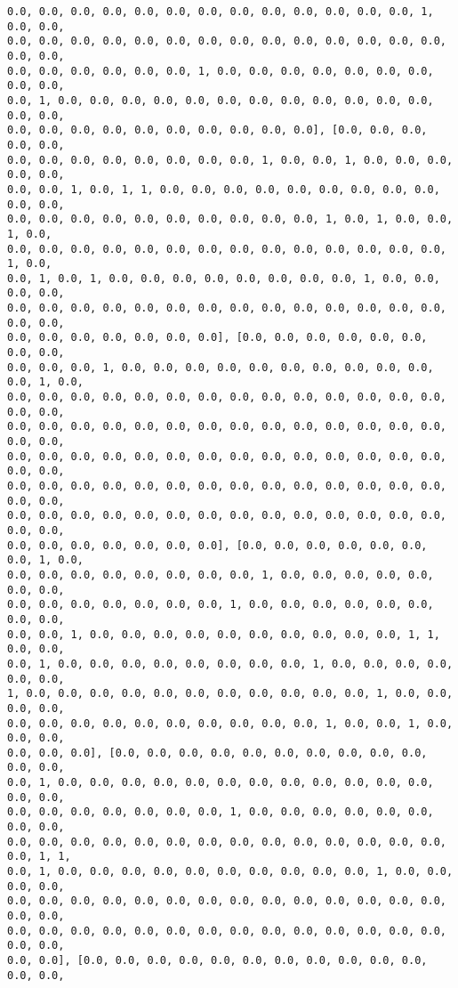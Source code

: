 \documentclass[11pt]{article}
\begin{document}
\begin{Verbatim}[commandchars=\\\{\}]
0.0, 0.0, 0.0, 0.0, 0.0, 0.0, 0.0, 0.0, 0.0, 0.0, 0.0, 0.0, 0.0, 1, 0.0, 0.0,
0.0, 0.0, 0.0, 0.0, 0.0, 0.0, 0.0, 0.0, 0.0, 0.0, 0.0, 0.0, 0.0, 0.0, 0.0, 0.0,
0.0, 0.0, 0.0, 0.0, 0.0, 0.0, 1, 0.0, 0.0, 0.0, 0.0, 0.0, 0.0, 0.0, 0.0, 0.0,
0.0, 1, 0.0, 0.0, 0.0, 0.0, 0.0, 0.0, 0.0, 0.0, 0.0, 0.0, 0.0, 0.0, 0.0, 0.0,
0.0, 0.0, 0.0, 0.0, 0.0, 0.0, 0.0, 0.0, 0.0, 0.0], [0.0, 0.0, 0.0, 0.0, 0.0,
0.0, 0.0, 0.0, 0.0, 0.0, 0.0, 0.0, 0.0, 1, 0.0, 0.0, 1, 0.0, 0.0, 0.0, 0.0, 0.0,
0.0, 0.0, 1, 0.0, 1, 1, 0.0, 0.0, 0.0, 0.0, 0.0, 0.0, 0.0, 0.0, 0.0, 0.0, 0.0,
0.0, 0.0, 0.0, 0.0, 0.0, 0.0, 0.0, 0.0, 0.0, 0.0, 1, 0.0, 1, 0.0, 0.0, 1, 0.0,
0.0, 0.0, 0.0, 0.0, 0.0, 0.0, 0.0, 0.0, 0.0, 0.0, 0.0, 0.0, 0.0, 0.0, 1, 0.0,
0.0, 1, 0.0, 1, 0.0, 0.0, 0.0, 0.0, 0.0, 0.0, 0.0, 0.0, 1, 0.0, 0.0, 0.0, 0.0,
0.0, 0.0, 0.0, 0.0, 0.0, 0.0, 0.0, 0.0, 0.0, 0.0, 0.0, 0.0, 0.0, 0.0, 0.0, 0.0,
0.0, 0.0, 0.0, 0.0, 0.0, 0.0, 0.0], [0.0, 0.0, 0.0, 0.0, 0.0, 0.0, 0.0, 0.0,
0.0, 0.0, 0.0, 1, 0.0, 0.0, 0.0, 0.0, 0.0, 0.0, 0.0, 0.0, 0.0, 0.0, 0.0, 1, 0.0,
0.0, 0.0, 0.0, 0.0, 0.0, 0.0, 0.0, 0.0, 0.0, 0.0, 0.0, 0.0, 0.0, 0.0, 0.0, 0.0,
0.0, 0.0, 0.0, 0.0, 0.0, 0.0, 0.0, 0.0, 0.0, 0.0, 0.0, 0.0, 0.0, 0.0, 0.0, 0.0,
0.0, 0.0, 0.0, 0.0, 0.0, 0.0, 0.0, 0.0, 0.0, 0.0, 0.0, 0.0, 0.0, 0.0, 0.0, 0.0,
0.0, 0.0, 0.0, 0.0, 0.0, 0.0, 0.0, 0.0, 0.0, 0.0, 0.0, 0.0, 0.0, 0.0, 0.0, 0.0,
0.0, 0.0, 0.0, 0.0, 0.0, 0.0, 0.0, 0.0, 0.0, 0.0, 0.0, 0.0, 0.0, 0.0, 0.0, 0.0,
0.0, 0.0, 0.0, 0.0, 0.0, 0.0, 0.0], [0.0, 0.0, 0.0, 0.0, 0.0, 0.0, 0.0, 1, 0.0,
0.0, 0.0, 0.0, 0.0, 0.0, 0.0, 0.0, 0.0, 1, 0.0, 0.0, 0.0, 0.0, 0.0, 0.0, 0.0,
0.0, 0.0, 0.0, 0.0, 0.0, 0.0, 0.0, 1, 0.0, 0.0, 0.0, 0.0, 0.0, 0.0, 0.0, 0.0,
0.0, 0.0, 1, 0.0, 0.0, 0.0, 0.0, 0.0, 0.0, 0.0, 0.0, 0.0, 0.0, 1, 1, 0.0, 0.0,
0.0, 1, 0.0, 0.0, 0.0, 0.0, 0.0, 0.0, 0.0, 0.0, 1, 0.0, 0.0, 0.0, 0.0, 0.0, 0.0,
1, 0.0, 0.0, 0.0, 0.0, 0.0, 0.0, 0.0, 0.0, 0.0, 0.0, 0.0, 1, 0.0, 0.0, 0.0, 0.0,
0.0, 0.0, 0.0, 0.0, 0.0, 0.0, 0.0, 0.0, 0.0, 0.0, 1, 0.0, 0.0, 1, 0.0, 0.0, 0.0,
0.0, 0.0, 0.0], [0.0, 0.0, 0.0, 0.0, 0.0, 0.0, 0.0, 0.0, 0.0, 0.0, 0.0, 0.0,
0.0, 1, 0.0, 0.0, 0.0, 0.0, 0.0, 0.0, 0.0, 0.0, 0.0, 0.0, 0.0, 0.0, 0.0, 0.0,
0.0, 0.0, 0.0, 0.0, 0.0, 0.0, 0.0, 1, 0.0, 0.0, 0.0, 0.0, 0.0, 0.0, 0.0, 0.0,
0.0, 0.0, 0.0, 0.0, 0.0, 0.0, 0.0, 0.0, 0.0, 0.0, 0.0, 0.0, 0.0, 0.0, 0.0, 1, 1,
0.0, 1, 0.0, 0.0, 0.0, 0.0, 0.0, 0.0, 0.0, 0.0, 0.0, 0.0, 1, 0.0, 0.0, 0.0, 0.0,
0.0, 0.0, 0.0, 0.0, 0.0, 0.0, 0.0, 0.0, 0.0, 0.0, 0.0, 0.0, 0.0, 0.0, 0.0, 0.0,
0.0, 0.0, 0.0, 0.0, 0.0, 0.0, 0.0, 0.0, 0.0, 0.0, 0.0, 0.0, 0.0, 0.0, 0.0, 0.0,
0.0, 0.0], [0.0, 0.0, 0.0, 0.0, 0.0, 0.0, 0.0, 0.0, 0.0, 0.0, 0.0, 0.0, 0.0,

\end{Verbatim}
\end{document}
